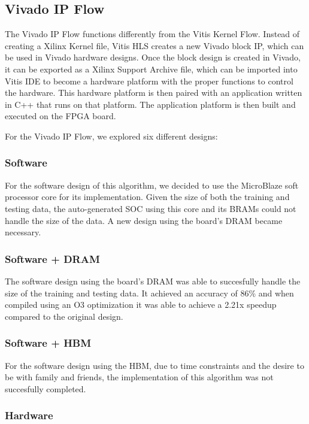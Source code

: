 \documentclass[11pt, final, conference, letterpaper, twocolumn]{IEEEtran}[2015/08/26]
\begin{document}
\subsection{Vivado IP Flow}

The Vivado IP Flow functions differently from the Vitis Kernel Flow. Instead of creating a Xilinx Kernel file, Vitis HLS creates a new Vivado block IP, which can be used in Vivado hardware designs. Once the block design is created in Vivado, it can be exported as a Xilinx Support Archive file, which can be imported into Vitis IDE to become a hardware platform with the proper functions to control the hardware. This hardware platform is then paired with an application written in C++ that runs on that platform. The application platform is then built and executed on the FPGA board.

For the Vivado IP Flow, we explored six different designs:

\subsubsection{Software}

For the software design of this algorithm, we decided to use the MicroBlaze soft processor core for its implementation.
Given the size of both the training and testing data, the auto-generated SOC using this core and its BRAMs could not handle the size of the data.
A new design using the board's DRAM became necessary.

\subsubsection{Software + DRAM}

The software design using the board's DRAM was able to succesfully handle the size of the training and testing data.
It achieved an accuracy of 86\% and when compiled using an O3 optimization it was able to achieve a 2.21x speedup compared to the original design.

\subsubsection{Software + HBM}

For the software design using the HBM, due to time constraints and the desire to be with family and friends, the implementation of this algorithm was not succesfully completed.

\subsubsection{Hardware}
\end{document}
